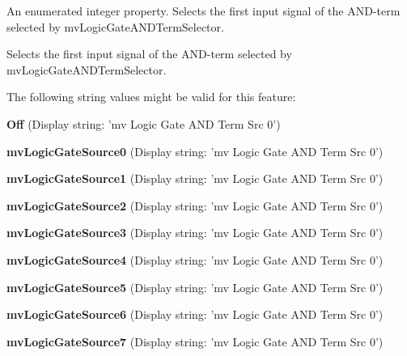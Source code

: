 An enumerated integer property. Selects the first input signal of the A\+N\+D-\/term selected by mv\+Logic\+Gate\+A\+N\+D\+Term\+Selector. 

Selects the first input signal of the A\+N\+D-\/term selected by mv\+Logic\+Gate\+A\+N\+D\+Term\+Selector.

The following string values might be valid for this feature\+:
\begin{DoxyItemize}
\item {\bfseries Off} (Display string\+: 'mv Logic Gate A\+N\+D Term Src 0')
\item {\bfseries mv\+Logic\+Gate\+Source0} (Display string\+: 'mv Logic Gate A\+N\+D Term Src 0')
\item {\bfseries mv\+Logic\+Gate\+Source1} (Display string\+: 'mv Logic Gate A\+N\+D Term Src 0')
\item {\bfseries mv\+Logic\+Gate\+Source2} (Display string\+: 'mv Logic Gate A\+N\+D Term Src 0')
\item {\bfseries mv\+Logic\+Gate\+Source3} (Display string\+: 'mv Logic Gate A\+N\+D Term Src 0')
\item {\bfseries mv\+Logic\+Gate\+Source4} (Display string\+: 'mv Logic Gate A\+N\+D Term Src 0')
\item {\bfseries mv\+Logic\+Gate\+Source5} (Display string\+: 'mv Logic Gate A\+N\+D Term Src 0')
\item {\bfseries mv\+Logic\+Gate\+Source6} (Display string\+: 'mv Logic Gate A\+N\+D Term Src 0')
\item {\bfseries mv\+Logic\+Gate\+Source7} (Display string\+: 'mv Logic Gate A\+N\+D Term Src 0')
\end{DoxyItemize}


